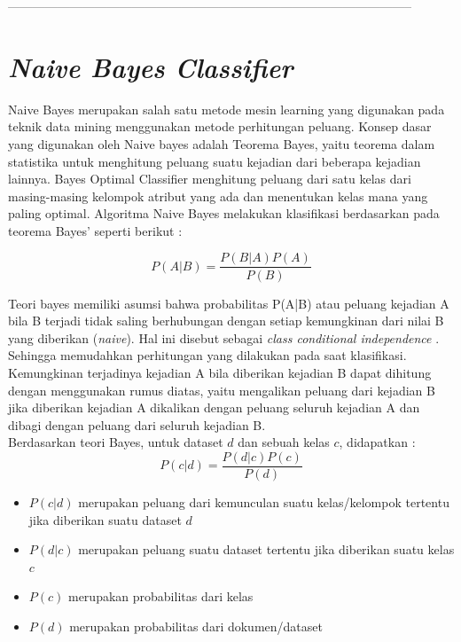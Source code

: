 		
--------------------------------------------------------------------------------------------------

\section{\textit{Naive Bayes Classifier}}
	
	 Naive Bayes merupakan salah satu metode mesin learning yang digunakan pada teknik data mining menggunakan metode perhitungan peluang. Konsep dasar yang digunakan oleh Naive bayes adalah Teorema Bayes, yaitu teorema dalam statistika untuk menghitung peluang suatu kejadian dari beberapa kejadian lainnya. Bayes Optimal Classifier menghitung peluang dari satu kelas dari masing-masing kelompok atribut yang ada dan menentukan kelas mana yang paling optimal. Algoritma Naive Bayes melakukan klasifikasi berdasarkan pada teorema Bayes' seperti berikut : 

\begin{equation}
P(A|B) = \dfrac{P(B|A)P(A)}{P(B)}
\end{equation}

	Teori bayes memiliki asumsi bahwa probabilitas P(A|B) atau peluang kejadian A bila B terjadi tidak saling berhubungan dengan setiap kemungkinan dari nilai B yang diberikan (\textit{naive}). Hal ini disebut sebagai \textit{class conditional independence} . Sehingga memudahkan perhitungan yang dilakukan pada saat klasifikasi. Kemungkinan terjadinya kejadian A bila diberikan kejadian B dapat dihitung dengan menggunakan rumus diatas, yaitu mengalikan peluang dari kejadian B jika diberikan kejadian A dikalikan dengan peluang seluruh kejadian A dan dibagi dengan peluang dari seluruh kejadian B.\\

Berdasarkan teori Bayes, untuk dataset $d$ dan sebuah kelas $c$, didapatkan : \\

\begin{equation}
P(c|d) = \dfrac{P(d|c)P(c)}{P(d)}
\end{equation}

\begin{itemize}
	\item $P(c|d)$ merupakan peluang dari kemunculan suatu kelas/kelompok tertentu jika diberikan suatu dataset $d$
	\item $P(d|c)$ merupakan peluang suatu dataset tertentu jika diberikan suatu kelas $c$
	\item $P(c)$ merupakan probabilitas dari kelas
	\item $P(d)$ merupakan probabilitas dari dokumen/dataset
\end{itemize}

